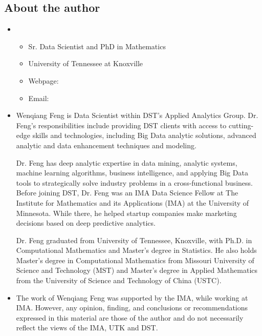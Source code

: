 \documentclass[letterpaper,11pt,english]{sphinxmanual}
\begin{document}
\subsection{About the author}
\label{\detokenize{preface:about-the-author}}\begin{itemize}
\item {} 
\begin{itemize}
\item {} 
Sr. Data Scientist and PhD in Mathematics

\item {} 
University of Tennessee at Knoxville

\item {} 
Webpage: 

\item {} 
Email: 

\end{itemize}

\item {} 

Wenqiang Feng is Data Scientist within DST’s Applied Analytics Group. Dr. Feng’s responsibilities include providing
DST clients with access to cutting-edge skills and technologies, including Big Data analytic solutions, advanced
analytic and data enhancement techniques and modeling.

Dr. Feng has deep analytic expertise in data mining, analytic systems, machine learning algorithms, business
intelligence, and applying Big Data tools to strategically solve industry problems in a cross-functional business.
Before joining DST, Dr. Feng was an IMA Data Science Fellow at The Institute for Mathematics and its
Applications (IMA) at the University of Minnesota. While there, he helped startup companies make marketing
decisions based on deep predictive analytics.

Dr. Feng graduated from University of Tennessee, Knoxville, with Ph.D. in Computational Mathematics and Master’s
degree in Statistics. He also holds Master’s degree in Computational Mathematics from Missouri University of
Science and Technology (MST) and Master’s degree in Applied Mathematics from the University of Science and
Technology of China (USTC).

\item {} 

The work of Wenqiang Feng was supported by the IMA, while working at IMA. However, any opinion, finding,
and conclusions or recommendations expressed in this material are those of the author and do not necessarily
reflect the views of the IMA, UTK and DST.

\end{itemize}
\end{document}
